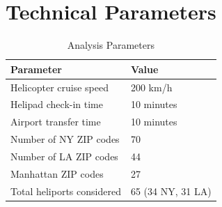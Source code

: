 \documentclass[12pt,a4paper]{article}
\begin{document}
\section{Technical Parameters}

\begin{table}[H]
\centering
\caption{Analysis Parameters}
\begin{tabular}{ll}
\toprule
\textbf{Parameter} & \textbf{Value} \\
\midrule
Helicopter cruise speed & 200 km/h \\
Helipad check-in time & 10 minutes \\
Airport transfer time & 10 minutes \\
Number of NY ZIP codes & 70 \\
Number of LA ZIP codes & 44 \\
Manhattan ZIP codes & 27 \\
Total heliports considered & 65 (34 NY, 31 LA) \\
\bottomrule
\end{tabular}
\end{table}
\end{document}

